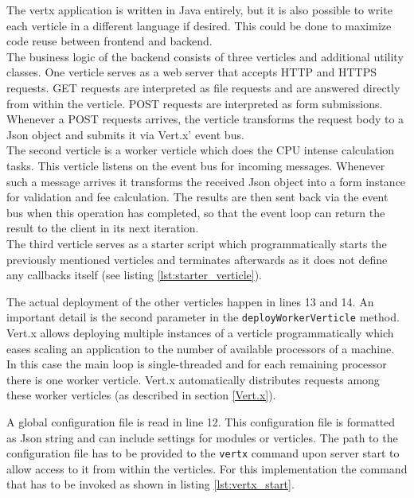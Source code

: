The vertx application is written in Java entirely, but it is also possible to
write each verticle in a different language if desired. This could be done to
maximize code reuse between frontend and backend.\\
The business logic of the backend consists of three verticles and additional
utility classes.
One verticle serves as a web server that accepts HTTP and HTTPS requests. GET
requests are interpreted as file requests and are answered directly from within
the verticle. POST requests are interpreted as form submissions. Whenever a POST
requests arrives, the verticle transforms the request body to a Json object and
submits it via Vert.x' event bus.\\
The second verticle is a worker verticle which does the CPU intense calculation
tasks. This verticle listens on the event bus for incoming messages. Whenever
such a message arrives it transforms the received Json object into a form
instance for validation and fee calculation. The results are then sent back via
the event bus when this operation has completed, so that the event loop can return
the result to the client in its next iteration.\\
The third verticle serves as a starter script which programmatically starts
the previously mentioned verticles and terminates afterwards as it does not
define any callbacks itself (see listing \ref{lst:starter_verticle}).



The actual deployment of the other verticles happen in lines 13 and 14.
An important detail is the second parameter in the \texttt{deployWorkerVerticle} method.
Vert.x allows deploying multiple instances of a verticle programmatically
which eases scaling an application to the number of available processors of a machine.
In this case the main loop is single-threaded and for each remaining processor
there is one worker verticle. Vert.x automatically distributes requests among
these worker verticles (as described in section \ref{Vert.x}).

A global configuration file is read in line 12. This configuration file is
formatted as Json string and can include settings for modules or verticles. The
path to the configuration file has to be provided to the \texttt{vertx} command
upon server start to allow access to it from within the verticles. For this implementation the command that
has to be invoked as shown in listing \ref{lst:vertx_start}.

